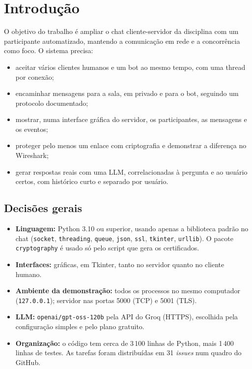 \documentclass[11pt,a4paper]{article}
\newcommand{\cod}[1]{\texttt{#1}}
\begin{document}
\tableofcontents
\clearpage

\section{Introdução}

O objetivo do trabalho é ampliar o chat cliente-servidor da disciplina com um participante
automatizado, mantendo a comunicação em rede e a concorrência como foco. O sistema precisa:
\begin{itemize}
  \item aceitar vários clientes humanos e um bot ao mesmo tempo, com uma thread por conexão;
  \item encaminhar mensagens para a sala, em privado e para o bot, seguindo um protocolo documentado;
  \item mostrar, numa interface gráfica do servidor, os participantes, as mensagens e os eventos;
  \item proteger pelo menos um enlace com criptografia e demonstrar a diferença no Wireshark;
  \item gerar respostas reais com uma LLM, correlacionadas à pergunta e ao usuário certos, com
        histórico curto e separado por usuário.
\end{itemize}

\subsection{Decisões gerais}
\begin{itemize}
  \item \textbf{Linguagem:} Python 3.10 ou superior, usando apenas a biblioteca padrão no chat
        (\cod{socket}, \cod{threading}, \cod{queue}, \cod{json}, \cod{ssl}, \cod{tkinter},
        \cod{urllib}). O pacote \cod{cryptography} é usado só pelo script que gera os certificados.
  \item \textbf{Interfaces:} gráficas, em Tkinter, tanto no servidor quanto no cliente humano.
  \item \textbf{Ambiente da demonstração:} todos os processos no mesmo computador
        (\cod{127.0.0.1}); servidor nas portas 5000 (TCP) e 5001 (TLS).
  \item \textbf{LLM:} \cod{openai/gpt-oss-120b} pela API do Groq (HTTPS), escolhida pela
        configuração simples e pelo plano gratuito.
  \item \textbf{Organização:} o código tem cerca de 3\,100 linhas de Python, mais 1\,400 linhas
        de testes. As tarefas foram distribuídas em 31 \emph{issues} num quadro do GitHub.
\end{itemize}
\end{document}
